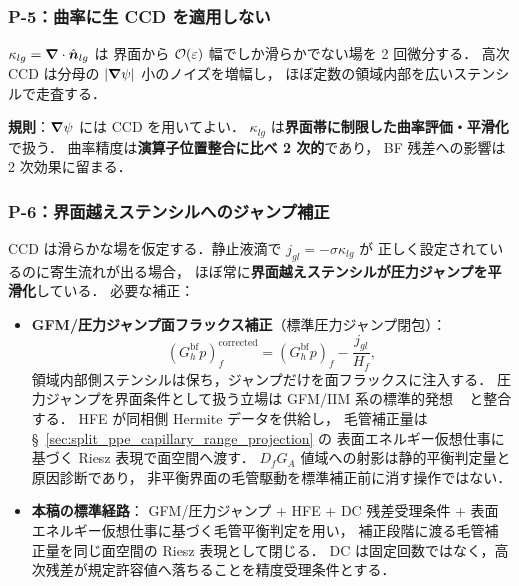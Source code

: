 \subsubsection{P-5：曲率に生 CCD を適用しない}
\label{sec:bf_p5_curvature}

$\kappa_{lg} = \bm{\nabla}\cdot\hat{\bm n}_{lg}$ は
界面から $\mathcal{O}(\varepsilon)$ 幅でしか滑らかでない場を 2 回微分する．
高次 CCD は分母の $|\bm{\nabla}\psi|$ 小のノイズを増幅し，
ほぼ定数の領域内部を広いステンシルで走査する．

\noindent\textbf{規則}：$\bm{\nabla}\psi$ には CCD を用いてよい．
$\kappa_{lg}$ は\textbf{界面帯に制限した曲率評価・平滑化}で扱う．
曲率精度は\textbf{演算子位置整合に比べ 2 次的}であり，
BF 残差への影響は 2 次効果に留まる．

\subsubsection{P-6：界面越えステンシルへのジャンプ補正}
\label{sec:bf_p6_jump}

CCD は滑らかな場を仮定する．静止液滴で $j_{gl}=-\sigma\kappa_{lg}$ が
正しく設定されているのに寄生流れが出る場合，
ほぼ常に\textbf{界面越えステンシルが圧力ジャンプを平滑化}している．
必要な補正：
\begin{itemize}[noitemsep]
  \item \textbf{GFM/圧力ジャンプ面フラックス補正}（標準圧力ジャンプ閉包）：
  \begin{equation}
    (G_h^\text{bf} p)_f^\text{corrected}
      = (G_h^\text{bf} p)_f - \frac{j_{gl}}{H_f},
    \label{eq:bf_p6_gfm}
  \end{equation}
  領域内部側ステンシルは保ち，ジャンプだけを面フラックスに注入する．
  圧力ジャンプを界面条件として扱う立場は GFM/IIM 系の標準的発想
  ~\cite{Fedkiw1999,Kang2000,LeVequeLi1994,Li2003IIMOverview} と整合する．
  HFE が同相側 Hermite データを供給し，
  毛管補正量は §~\ref{sec:split_ppe_capillary_range_projection} の
  表面エネルギー仮想仕事に基づく Riesz 表現で面空間へ渡す．
  $D_fG_A$ 値域への射影は静的平衡判定量と原因診断であり，
  非平衡界面の毛管駆動を標準補正前に消す操作ではない．
  \item \textbf{本稿の標準経路}：
  GFM/圧力ジャンプ + HFE + DC 残差受理条件 + 表面エネルギー仮想仕事に基づく毛管平衡判定を用い，
  補正段階に渡る毛管補正量を同じ面空間の Riesz 表現として閉じる．
  DC は固定回数ではなく，高次残差が規定許容値へ落ちることを精度受理条件とする．
\end{itemize}

